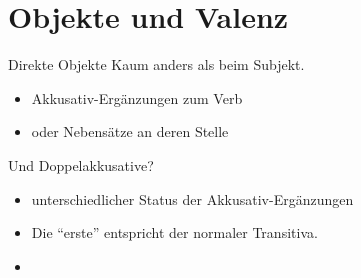\section{Objekte und Valenz}

\begin{frame}
  {Direkte Objekte}
  \onslide<+->
  \onslide<+->
   Kaum anders als beim Subjekt.
  \begin{itemize}[<+->]
    \item \alert{Akkusativ-Ergänzungen zum Verb}
    \item \alert{oder Nebensätze an deren Stelle}
  \end{itemize}
  \onslide<+->
  \Halbzeile
  Und Doppelakkusative?\\
  \onslide<+->
  \begin{exe}
    \ex\label{ex:akkusativeunddirekteobjekte158}
    \begin{xlist}
      \onslide<+->
      \onslide<+->
      \onslide<+->
    \end{xlist}
  \end{exe}
  \begin{itemize}[<+->]
    \item unterschiedlicher Status der Akkusativ-Ergänzungen
    \item Die "`erste"' entspricht der normaler Transitiva.
    \item {}
  \end{itemize} 
\end{frame}

